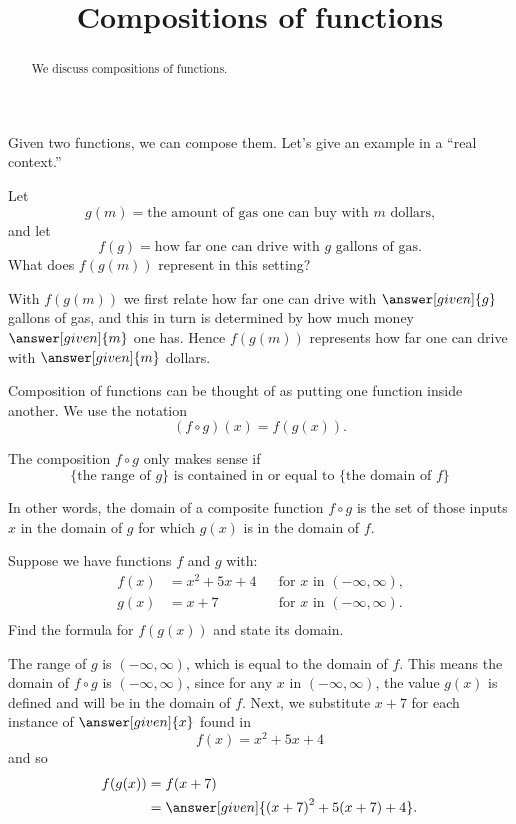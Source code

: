 \documentclass{ximera}
\title[Dig-In:]{Compositions of functions}
\begin{document}
\begin{abstract}
  We discuss compositions of functions.
\end{abstract}
\maketitle


Given two functions, we can compose them. Let's give an example in a
``real context.''

\begin{example}
  Let
  \[
  g(m) = \text{the amount of gas one can buy with $m$ dollars,}
  \]
  and let
  \[
  f(g) = \text{how far one can drive with $g$ gallons of gas.}
  \]
  What does $f(g(m))$ represent in this setting?
  \begin{explanation}
    With $f(g(m))$ we first relate how far one can drive with
    $\answer[given]{g}$ gallons of gas, and this in turn is determined
    by how much money $\answer[given]{m}$ one has. Hence $f(g(m))$ represents how far
    one can drive with $\answer[given]{m}$ dollars.
  \end{explanation}
\end{example}

Composition of functions can be thought of as putting one function
inside another.  We use the notation
\[
(f\circ g)(x) = f(g(x)).
\]
\begin{warning}
  The composition $f\circ g$ only makes sense if
  \[
  \{\text{the range of $g$}\}
  \text{ is contained in or equal to }
  \{\text{the domain of $f$}\}
  \]
\end{warning}
In other words, the domain of a composite function $f\circ g$ is the set of those inputs $x$ in the domain of $g$ for which $g(x)$ is in the domain of $f$. 

\begin{example}
 Suppose we have functions $f$ and $g$ with:
\begin{align*}
  f(x)&={{x}^{2}}+5x+4 &&\text{for $x$ in $(-\infty, \infty)$,}\\
  g(x)&= x+7 &&\text{for $x$ in $(-\infty, \infty)$.}\\
\end{align*}
Find the formula for $f(g(x))$ and state its domain.
\begin{explanation}
  The range of $g$ is $(-\infty, \infty)$, which is equal to the
  domain of $f$. This means the domain of $f\circ g$ is $(-\infty, \infty)$, since for any $x$ in $(-\infty, \infty)$, 
  the value $g(x)$ is defined and will be in the domain of $f$. 
  Next, we substitute $x+7$ for each instance of $\answer[given]{x}$ found
  in
  \[
  f(x)={{x}^{2}}+5x+4
  \]
  and so
  \begin{align*}
  f(g(x)) &=f(x+7)\\
  &=\answer[given]{{{(x+7)}^{2}}+5(x+7)+4}.
  \end{align*}
\end{explanation}
\end{example}
\end{document}

